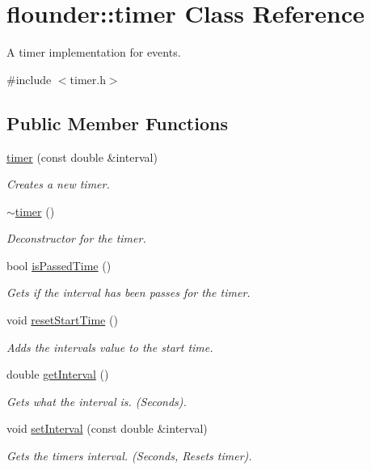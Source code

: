 \hypertarget{classflounder_1_1timer}{}\section{flounder\+:\+:timer Class Reference}
\label{classflounder_1_1timer}


A timer implementation for events.  




{\ttfamily \#include $<$timer.\+h$>$}

\subsection*{Public Member Functions}
\begin{DoxyCompactItemize}
\item 
\hyperlink{classflounder_1_1timer_afbe92e026c43d2cacb8172963e4ab6d9}{timer} (const double \&interval)
\begin{DoxyCompactList}\small\item\em Creates a new timer. \end{DoxyCompactList}\item 
\hyperlink{classflounder_1_1timer_a2644c550b3bb6aa1c757287a72ff9179}{$\sim$timer} ()
\begin{DoxyCompactList}\small\item\em Deconstructor for the timer. \end{DoxyCompactList}\item 
bool \hyperlink{classflounder_1_1timer_a2758150edc9d0f3c8f1248183df7c0b5}{is\+Passed\+Time} ()
\begin{DoxyCompactList}\small\item\em Gets if the interval has been passes for the timer. \end{DoxyCompactList}\item 
void \hyperlink{classflounder_1_1timer_af71405c5ec11d085c91aa26d6a8d994c}{reset\+Start\+Time} ()
\begin{DoxyCompactList}\small\item\em Adds the intervals value to the start time. \end{DoxyCompactList}\item 
double \hyperlink{classflounder_1_1timer_a2e96c23a1baa9284269c000a6c6ba181}{get\+Interval} ()
\begin{DoxyCompactList}\small\item\em Gets what the interval is. (Seconds). \end{DoxyCompactList}\item 
void \hyperlink{classflounder_1_1timer_a801b9883c757b92eaa957f3222c4791d}{set\+Interval} (const double \&interval)
\begin{DoxyCompactList}\small\item\em Gets the timers interval. (Seconds, Resets timer). \end{DoxyCompactList}\end{DoxyCompactItemize}
